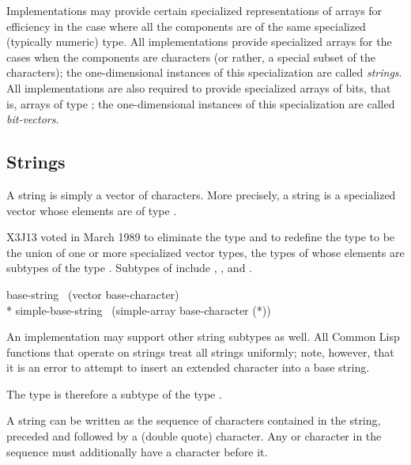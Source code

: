 Implementations may provide certain specialized representations of
arrays for efficiency in the case where all the components are of
the same specialized (typically numeric) type.  All implementations
provide specialized arrays for the cases when the components
are characters (or rather, a special subset of the characters);
the one-dimensional instances of
this specialization are called {\it strings}.
All implementations are also required to provide specialized arrays
of bits, that is, arrays of type ;
the one-dimensional instances of
this specialization are called {\it bit-vectors}.

\subsection{Strings}
\label{STRING-TYPE-SECTION}

\begin{obsolete}
A string is simply a vector of characters.
More precisely, a string is a specialized vector whose elements
are of type .
\end{obsolete}
\begin{newer}
X3J13 voted in March 1989 
to eliminate the type  and to redefine the type
 to be the union of one or more specialized vector
types, the types of whose elements are subtypes of the type .
Subtypes of  include , ,
and .

\vskip 3pt
\begin{lisp}
base-string \EQ\ (vector base-character) \\*
simple-base-string \EQ\ (simple-array base-character (*))
\end{lisp}
An implementation may support
other string subtypes as well.  All Common Lisp functions that operate
on strings treat all strings uniformly; note, however,
that it is an error to attempt to insert
an extended character into a base string.
\end{newer}

\newpage%

The type  is therefore a subtype of the type .

A string can be written as the sequence of characters contained in the
string, preceded and followed by a  (double quote) character.
Any  or \cd{{\Xbackslash}} character in the sequence must additionally
have a \cd{{\Xbackslash}} character before it.

